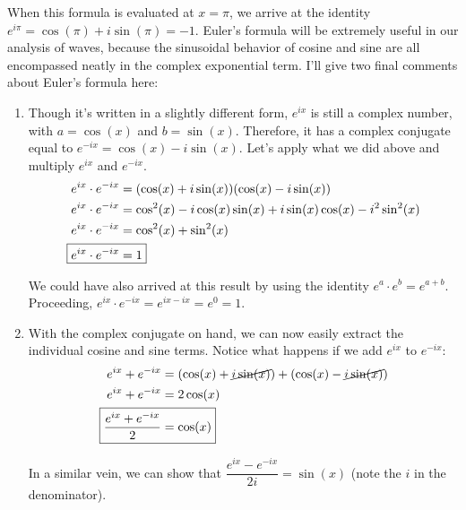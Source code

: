 When this formula is evaluated at $x=\pi$, we arrive at the identity $e^{i\pi} = \cos(\pi) + i\sin(\pi) = -1$. Euler's formula will be extremely useful in our analysis of waves, because the sinusoidal behavior of cosine and sine are all encompassed neatly in the complex exponential term. I'll give two final comments about Euler's formula here:
\begin{enumerate}[1.]
	\item Though it's written in a slightly different form, $e^{ix}$ is still a complex number, with $a = \cos(x)$ and $b = \sin(x)$. Therefore, it has a complex conjugate equal to $e^{-ix}=\cos(x) -i\sin(x)$. Let's apply what we did above and multiply $e^{ix}$ and $e^{-ix}$.
	\begin{align*}
	e^{ix} \cdot e^{-ix} &= (\cos(x) + i\sin(x))(\cos(x)-i\sin(x)) \\
	e^{ix} \cdot e^{-ix} &= \cos^2(x) -i\cos(x)\sin(x) + i\sin(x)\cos(x) -i^2\sin^2(x) \\
	e^{ix} \cdot e^{-ix} &= \cos^2(x) + \sin^2(x) \\
	\Aboxed{e^{ix} \cdot e^{-ix} &= 1} 
	\end{align*}
	
	We could have also arrived at this result by using the identity $e^a \cdot e^b = e^{a+b}$. Proceeding, $e^{ix} \cdot e^{-ix} = e^{ix - ix} = e^0 = 1$.
	
	\item With the complex conjugate on hand, we can now easily extract the individual cosine and sine terms. Notice what happens if we add $e^{ix}$ to $e^{-ix}$:
	\begin{align*}
	e^{ix} + e^{-ix} &= (\cos(x) + \cancel{i\sin(x)}) + (\cos(x) - \cancel{i\sin(x)}) \\
	e^{ix} + e^{-ix} &= 2\cos(x) \\
	\Aboxed{ \dfrac{e^{ix} + e^{-ix}}{2}&= \cos(x) }
	\end{align*}
	
	In a similar vein, we can show that $\boxed{\dfrac{e^{ix} - e^{-ix}}{2i} = \sin(x)}$ (note the $i$ in the denominator).
	
\end{enumerate}


